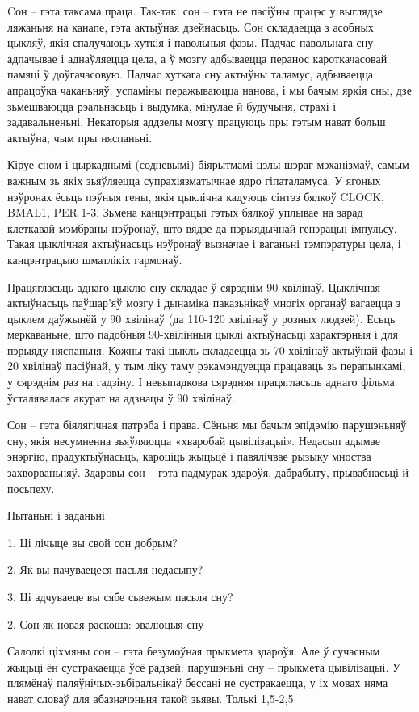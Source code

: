 Cон – гэта таксама праца. Так-так, сон – гэта не пасіўны працэс у выглядзе ляжаньня на канапе, гэта актыўная дзейнасьць. Сон складаецца з асобных цыкляў, якія спалучаюць хуткія і павольныя фазы. Падчас павольнага сну адпачывае і аднаўляецца цела, а ў мозгу адбываецца перанос кароткачасовай памяці ў доўгачасовую. Падчас хуткага сну актыўны таламус, адбываецца апрацоўка чаканьняў, успаміны перажываюцца нанова, і мы бачым яркія сны, дзе зьмешваюцца рэальнасьць і выдумка, мінулае й будучыня, страхі і задавальненьні. Некаторыя аддзелы мозгу працуюць пры гэтым нават больш актыўна, чым пры няспаньні.

Кіруе сном і цыркаднымі (содневымі) біярытмамі цэлы шэраг мэханізмаў, самым важным зь якіх зьяўляецца супрахіязматычнае ядро гіпаталамуса. У ягоных нэўронах ёсьць пэўныя гены, якія цыклічна кадуюць сінтэз бялкоў CLOCK, BMAL1, PER 1-3. Зьмена канцэнтрацыі гэтых бялкоў уплывае на зарад клеткавай мэмбраны нэўронаў, што вядзе да пэрыядычнай генэрацыі імпульсу. Такая цыклічная актыўнасьць нэўронаў вызначае і ваганьні тэмпэратуры цела, і канцэнтрацыю шматлікіх гармонаў.

Працягласьць аднаго цыклю сну складае ў сярэднім 90 хвілінаў. Цыклічная актыўнасьць паўшар'яў мозгу і дынаміка паказьнікаў многіх органаў вагаецца з цыклем даўжынёй у 90 хвілінаў (да 110-120 хвілінаў у розных людзей). Ёсьць меркаваньне, што падобныя 90-хвілінныя цыклі актыўнасьці характэрныя і для пэрыяду няспаньня. Кожны такі цыкль складаецца зь 70 хвілінаў актыўнай фазы і 20 хвілінаў пасіўнай, у тым ліку таму рэкамэндуецца працаваць зь перапынкамі, у сярэднім раз на гадзіну. І невыпадкова сярэдняя працягласьць аднаго фільма ўсталявалася акурат на адзнацы ў 90 хвілінаў.

Сон – гэта біялягічная патрэба і права. Сёньня мы бачым эпідэмію парушэньняў сну, якія несумненна зьяўляюцца «хваробай цывілізацыі». Недасып адымае энэргію, прадуктыўнасьць, кароціць жыцьцё і павялічвае рызыку мноства захворваньняў. Здаровы сон – гэта падмурак здароўя, дабрабыту, прывабнасьці й посьпеху.

Пытаньні і заданьні

1. Ці лічыце вы свой сон добрым?

2. Як вы пачуваецеся пасьля недасыпу?

3. Ці адчуваеце вы сябе сьвежым пасьля сну?


2. Сон як новая раскоша: эвалюцыя сну

Салодкі ціхмяны сон – гэта безумоўная прыкмета здароўя. Але ў сучасным жыцьці ён сустракаецца ўсё радзей: парушэньні сну – прыкмета цывілізацыі. У плямёнаў паляўнічых-зьбіральнікаў бессані не сустракаецца, у іх мовах няма нават словаў для абазначэньня такой зьявы. Толькі 1,5-2,5%

